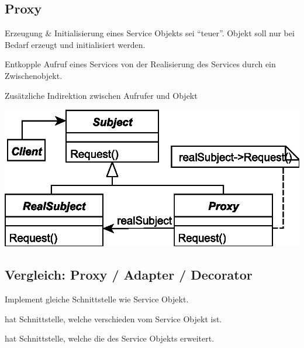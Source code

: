 \documentclass[a4paper,fontsize=9pt, DIV=calc]{scrartcl}
\begin{document}
\begin{multicols}{2}
\subsection{Proxy}
\begin{description}[leftmargin=*]\itemsep-2mm
\item[Motivation / Problem] Erzeugung \& Initialisierung eines Service Objekts sei "`teuer"'. Objekt soll nur bei Bedarf erzeugt und initialisiert werden.
\item[Lösung] Entkopple Aufruf eines Services von der Realisierung des Services durch ein Zwischenobjekt. 
\item[Konsequenzen] Zusätzliche Indirektion zwischen Aufrufer und Objekt

\end{description}

\begin{center}
	\includegraphics[width=0.80\columnwidth]{./new/proxy}
\end{center}

\subsection{Vergleich: Proxy / Adapter / Decorator}
\begin{description}[leftmargin=*]\itemsep-3mm
\item[Proxy] Implement gleiche Schnittstelle wie Service Objekt.
\item[Adapter] hat Schnittstelle, welche verschieden vom Service Objekt ist.
\item[Decorator] hat Schnittstelle, welche die des Service Objekts erweitert.
\end{description}




\end{multicols}
\end{document}
